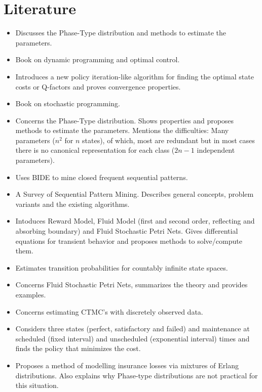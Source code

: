 \section{Literature}
\begin{itemize}
\item \citep{Asmussen1996} Discusses the Phase-Type distribution and methods to estimate the parameters.
\item \citep{Bertsekas1995} Book on dynamic programming and optimal control.
\item \citep{Bertsekas2012} Introduces a new policy iteration-like algorithm for finding the optimal state costs or Q-factors and proves convergence properties.
\item \citep{Birge2011} Book on stochastic programming.
\item \citep{Buchholz2014} Concerns the Phase-Type distribution. Shows properties and proposes methods to estimate the parameters. Mentions the difficulties: Many parameters ($n^2$ for $n$ states), of which, most are redundant but in most cases there is no canonical representation for each class ($2n-1$ independent parameters).
\item \citep{Chen2014} Uses BIDE to mine closed frequent sequential patterns.
\item \citep{Fournier-Viger2017} A Survey of Sequential Pattern Mining. Describes general concepts, problem variants and the existing algorithms.
\item \citep{Gribaudo2007} Intoduces Reward Model, Fluid Model (first and second order, reflecting and absorbing boundary) and Fluid Stochastic Petri Nets. Gives differential equations for transient behavior and proposes methods to solve/compute them.
\item\citep{Hajiaghayi2014} Estimates transition probabilities for countably infinite state spaces.
\item \citep{Horton1998} Concerns Fluid Stochastic Petri Nets, summarizes the theory and provides examples.
\item\citep{Inamura2006} Concerns estimating CTMC's with discretely observed data.
\item \citep{Kalosi2016} Considers three states (perfect, satisfactory and failed) and maintenance at scheduled (fixed interval) and unscheduled (exponential interval) times and finds the policy that minimizes the cost.
\item \citep{Lee2010} Proposes a method of modelling insurance losses via mixtures of Erlang distributions. Also explains why Phase-type distributions are not practical for this situation.

\end{itemize}
